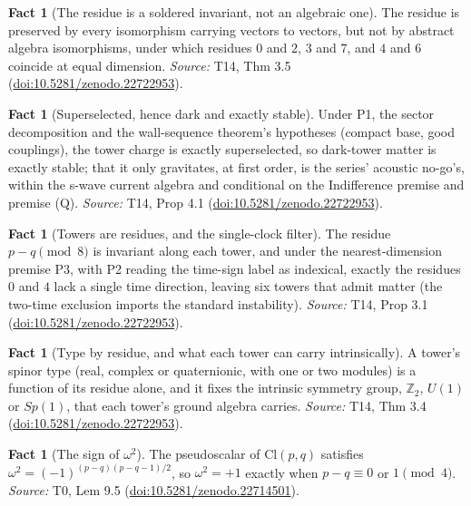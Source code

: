\documentclass[11pt]{article}
\theoremstyle{definition}
\newtheorem{fact}[theorem]{Fact}
\theoremstyle{plain}
\providecommand{\Cl}{}\renewcommand{\Cl}{\mathrm{Cl}}
\providecommand{\Z}{}\renewcommand{\Z}{\mathbb{Z}}
\begin{document}
\begin{fact}[The residue is a soldered invariant, not an algebraic one]\label{c:dark-matter.residue-soldered-invariant-not-algebraic-one}
The residue is preserved by every isomorphism carrying vectors to vectors, but not by abstract algebra isomorphisms, under which residues $0$ and $2$, $3$ and $7$, and $4$ and $6$ coincide at equal dimension.
\emph{Source:} T14, Thm 3.5 (\href{https://doi.org/10.5281/zenodo.22722953}{doi:10.5281/zenodo.22722953}).
\end{fact}

\begin{fact}[Superselected, hence dark and exactly stable]\label{c:dark-matter.superselected-hence-dark-exactly-stable}
Under P1, the sector decomposition and the wall-sequence theorem's hypotheses (compact base, good couplings), the tower charge is exactly superselected, so dark-tower matter is exactly stable; that it only gravitates, at first order, is the series' acoustic no-go's, within the s-wave current algebra and conditional on the Indifference premise and premise (Q).
\emph{Source:} T14, Prop 4.1 (\href{https://doi.org/10.5281/zenodo.22722953}{doi:10.5281/zenodo.22722953}).
\end{fact}

\begin{fact}[Towers are residues, and the single-clock filter]\label{c:dark-matter.towers-are-residues-single-clock-filter}
The residue $p - q \pmod 8$ is invariant along each tower, and under the nearest-dimension premise P3, with P2 reading the time-sign label as indexical, exactly the residues $0$ and $4$ lack a single time direction, leaving six towers that admit matter (the two-time exclusion imports the standard instability).
\emph{Source:} T14, Prop 3.1 (\href{https://doi.org/10.5281/zenodo.22722953}{doi:10.5281/zenodo.22722953}).
\end{fact}

\begin{fact}[Type by residue, and what each tower can carry intrinsically]\label{c:dark-matter.type-residue-what-each-tower-can}
A tower's spinor type (real, complex or quaternionic, with one or two modules) is a function of its residue alone, and it fixes the intrinsic symmetry group, $\Z_{2}$, $U(1)$ or $Sp(1)$, that each tower's ground algebra carries.
\emph{Source:} T14, Thm 3.4 (\href{https://doi.org/10.5281/zenodo.22722953}{doi:10.5281/zenodo.22722953}).
\end{fact}

\begin{fact}[The sign of $\omega^2$]\label{c:primer.sign}
The pseudoscalar of $\Cl(p,q)$ satisfies $\omega^{2} = (-1)^{(p-q)(p-q-1)/2}$, so $\omega^{2} = +1$ exactly when $p - q \equiv 0$ or $1 \pmod 4$.
\emph{Source:} T0, Lem 9.5 (\href{https://doi.org/10.5281/zenodo.22714501}{doi:10.5281/zenodo.22714501}).
\end{fact}
\end{document}
